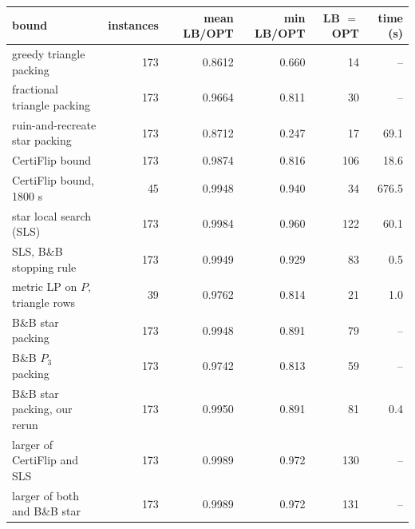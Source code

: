 \begin{tabular}{lrrrrr}
\toprule
bound & instances & mean LB/OPT & min LB/OPT & LB $=$ OPT & time (s) \\
\midrule
greedy triangle packing & 173 & 0.8612 & 0.660 & 14 & -- \\
fractional triangle packing & 173 & 0.9664 & 0.811 & 30 & -- \\
ruin-and-recreate star packing & 173 & 0.8712 & 0.247 & 17 & 69.1 \\
CertiFlip bound & 173 & 0.9874 & 0.816 & 106 & 18.6 \\
CertiFlip bound, 1800 s & 45 & 0.9948 & 0.940 & 34 & 676.5 \\
star local search (SLS) & 173 & 0.9984 & 0.960 & 122 & 60.1 \\
SLS, B\&B stopping rule & 173 & 0.9949 & 0.929 & 83 & 0.5 \\
metric LP on $P$, triangle rows & 39 & 0.9762 & 0.814 & 21 & 1.0 \\
B\&B star packing~\cite{BlasiusEtAl22sea} & 173 & 0.9948 & 0.891 & 79 & -- \\
B\&B $P_3$ packing~\cite{BlasiusEtAl22sea} & 173 & 0.9742 & 0.813 & 59 & -- \\
B\&B star packing, our rerun & 173 & 0.9950 & 0.891 & 81 & 0.4 \\
larger of CertiFlip and SLS & 173 & 0.9989 & 0.972 & 130 & -- \\
larger of both and B\&B star & 173 & 0.9989 & 0.972 & 131 & -- \\
\bottomrule
\end{tabular}
